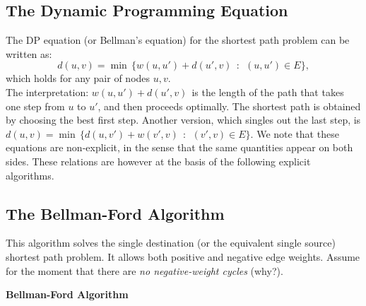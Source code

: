 \subsection{The Dynamic Programming Equation}
The DP equation (or Bellman's equation) for the shortest path problem can be written as:
\[d(u,v) = \min \,\{ w(u,u') + d(u',v)\,\;:\,\;(u,u') \in E\}, \]
which holds for any pair of nodes $u,v$.
\\
The interpretation: $w(u,u') + d(u',v)\,\;$is the length of the path that takes one step from $u$ to $u'$, and then proceeds optimally. The shortest path is obtained by choosing the best first step.
Another version, which singles out the last step, is
$d(u,v) = \min \,\{ d(u,v') + w(v',v)\,\;:\,\;(v',v) \in E\} $.
We note that these equations are non-explicit, in the sense that the same quantities appear on both sides.  These relations are however at the basis of the following explicit algorithms.

\subsection{The Bellman-Ford Algorithm}
This algorithm solves the single destination (or the equivalent single source) shortest path problem. It allows both positive and negative edge weights. Assume for the moment that there are \emph{no negative-weight cycles} (why?).

\begin{algorithm_}\textbf{Bellman-Ford Algorithm}
\end{algorithm_}

